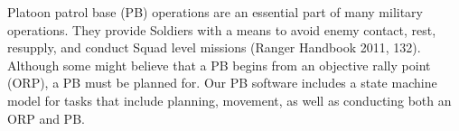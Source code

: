 Platoon patrol base (PB) operations are an essential part of many
military operations.  They provide Soldiers with a means to avoid
enemy contact, rest, resupply, and conduct Squad level missions
(Ranger Handbook 2011, 132). Although some might believe that a PB
begins from an objective rally point (ORP), a PB must be planned
for. Our PB software includes a state
machine model for tasks that include planning, movement, as well as conducting both an ORP and PB.





